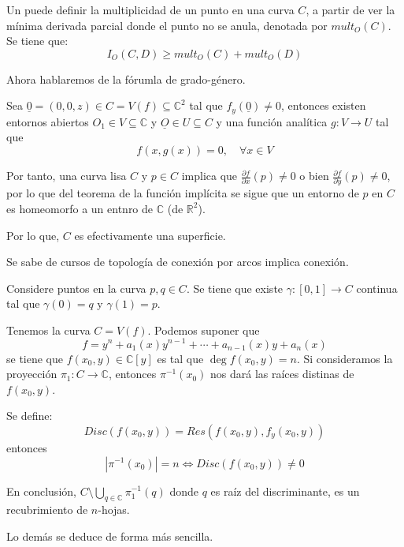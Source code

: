 \documentclass[12pt]{report}
\newcounter{it}
\theoremstyle{largebreak}
\newcommand\abs[1]{\ensuremath{\left|#1\right|}}
\newcommand\cf[3]{\ensuremath{#1:#2\rightarrow#3}}
\begin{document}
    Un puede definir la multiplicidad de un punto en una curva $C$, a partir de ver la mínima derivada parcial donde el punto no se anula, denotada por $mult_O(C)$. Se tiene que:
    \begin{equation*}
        I_O(C,D)\geq mult_O(C)+mult_O(D)
    \end{equation*}

    Ahora hablaremos de la fórumla de grado-género.

    \begin{theor}
        Sea $\underline{0}=(0,0,z)\in C=V(f)\subseteq\mathbb{C}^2$ tal que $f_y(\underline{0})\neq0$, entonces existen entornos abiertos $O_1\in V\subseteq \mathbb{C}$ y $\underline{O}\in U\subseteq C$ y una función analítica $\cf{g}{V}{U}$ tal que
        \begin{equation*}
            f(x,g(x))=0,\quad\forall x\in V
        \end{equation*}
    \end{theor}

    Por tanto, una curva lisa $C$ y $p\in C$ implica que $\frac{\partial f}{\partial x}(p)\neq 0$ o bien $\frac{\partial f}{\partial y}(p)\neq0$, por lo que del teorema de la función implícita se sigue que un entorno de $p$ en $C$ es homeomorfo a un entnro de $\mathbb{C}$ (de $\mathbb{R}^2$).
    
    Por lo que, $C$ es efectivamente una superficie.

    Se sabe de cursos de topología de conexión por arcos implica conexión.

    Considere puntos en la curva $p,q\in C$. Se tiene que existe $\cf{\gamma}{[0,1]}{C}$ continua tal que $\gamma(0)=q$ y $\gamma(1)=p$.

    Tenemos la curva $C=V(f)$. Podemos suponer que
    \begin{equation*}
        f=y^n+a_1(x)y^{ n-1}+\cdots+a_{ n-1}(x)y+a_n(x)
    \end{equation*}
    se tiene que $f(x_0,y)\in\mathbb{C}[y]$ es tal que $\deg f(x_0,y)=n$. Si consideramos la proyección $\cf{\pi_1}{C}{\mathbb{C}}$, entonces $\pi^{-1}(x_0)$ nos dará las raíces distinas de $f(x_0,y)$.

    Se define:
    \begin{equation*}
        Disc(f(x_0,y))=Res(f(x_0,y),f_y(x_0,y))
    \end{equation*}
    entonces
    \begin{equation*}
        \abs{\pi^{-1}(x_0)}=n\iff Disc(f(x_0,y))\neq0
    \end{equation*}

    En conclusión, $C\setminus\bigcup_{ q\in\mathbb{C} }\pi_1^{-1}(q)$ donde $q$ es raíz del discriminante, es un recubrimiento de $n$-hojas.

    Lo demás se deduce de forma más sencilla.
\end{document}
